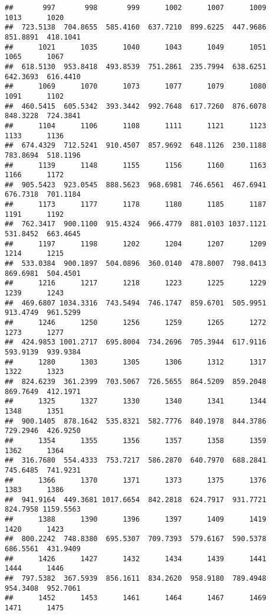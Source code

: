 \documentclass[
]{article}
\begin{document}
\begin{verbatim}
##       997       998       999      1002      1007      1009      1013      1020 
##  723.5138  704.8655  585.4160  637.7210  899.6225  447.9686  851.8891  418.1041 
##      1021      1035      1040      1043      1049      1051      1065      1067 
##  618.5130  953.8418  493.8539  751.2861  235.7994  638.6251  642.3693  616.4410 
##      1069      1070      1073      1077      1079      1080      1091      1102 
##  460.5415  605.5342  393.3442  992.7648  617.7260  876.6078  848.3228  724.3841 
##      1104      1106      1108      1111      1121      1123      1133      1136 
##  674.4329  712.5241  910.4507  857.9692  648.1126  230.1188  783.8694  518.1196 
##      1139      1148      1155      1156      1160      1163      1166      1172 
##  905.5423  923.0545  888.5623  968.6981  746.6561  467.6941  676.7318  701.1184 
##      1173      1177      1178      1180      1185      1187      1191      1192 
##  762.3417  900.1100  915.4324  966.4779  881.0103 1037.1121  531.8452  663.4645 
##      1197      1198      1202      1204      1207      1209      1214      1215 
##  533.0384  900.1897  504.0896  360.0140  478.8007  798.0413  869.6981  504.4501 
##      1216      1217      1218      1223      1225      1229      1239      1243 
##  469.6807 1034.3316  743.5494  746.1747  859.6701  505.9951  913.4749  961.5299 
##      1246      1250      1256      1259      1265      1272      1273      1277 
##  424.9853 1001.2717  695.8004  734.2696  705.3944  617.9116  593.9139  939.9384 
##      1280      1303      1305      1306      1312      1317      1322      1323 
##  824.6239  361.2399  703.5067  726.5655  864.5209  859.2048  869.7649  412.1971 
##      1325      1327      1330      1340      1341      1344      1348      1351 
##  900.1405  878.1642  535.8321  582.7776  840.1978  844.3786  729.2946  426.9250 
##      1354      1355      1356      1357      1358      1359      1362      1364 
##  316.7680  554.4333  753.7217  586.2870  640.7970  688.2841  745.6485  741.9231 
##      1366      1370      1371      1373      1375      1376      1383      1386 
##  941.9164  449.3681 1017.6654  842.2818  624.7917  931.7721  824.7958 1159.5563 
##      1388      1390      1396      1397      1409      1419      1420      1423 
##  800.2242  748.8380  695.5307  709.7393  579.6167  590.5378  686.5561  431.9409 
##      1426      1427      1432      1434      1439      1441      1444      1446 
##  797.5382  367.5939  856.1611  834.2620  958.9180  789.4948  954.3408  952.7061 
##      1452      1453      1461      1464      1467      1469      1471      1475 

\end{verbatim}
\end{document}
